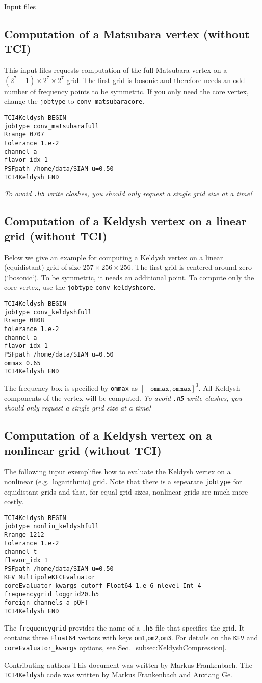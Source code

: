 \documentclass[12pt]{article}
\begin{document}
\begin{section}{Input files}
\subsection{Computation of a Matsubara vertex (without TCI)}
This input files requests computation of the full Matsubara vertex on a $(2^7+1)\times2^7\times2^7$ grid.
The first grid is bosonic and therefore needs an odd number of frequency points to be symmetric.
If you only need the core vertex, change the \texttt{jobtype} to \texttt{conv\_matsubaracore}.
\begin{verbatim}
TCI4Keldysh BEGIN
jobtype conv_matsubarafull
Rrange 0707
tolerance 1.e-2
channel a
flavor_idx 1
PSFpath /home/data/SIAM_u=0.50
TCI4Keldysh END  
\end{verbatim}
\textit{To avoid \texttt{.h5} write clashes, you should only request a single grid size at a time!}
\subsection{Computation of a Keldysh vertex on a linear grid (without TCI)}
Below we give an example for computing a Keldysh vertex on a linear (equidistant) grid of size
$257\times256\times256$. The first grid is centered around zero (`bosonic`). To be symmetric, it needs an additional point.
To compute only the core vertex, use the \texttt{jobtype} \texttt{conv\_keldyshcore}.
\begin{verbatim}
TCI4Keldysh BEGIN
jobtype conv_keldyshfull
Rrange 0808
tolerance 1.e-2
channel a
flavor_idx 1
PSFpath /home/data/SIAM_u=0.50
ommax 0.65
TCI4Keldysh END 
\end{verbatim}
The frequency box is specified by \texttt{ommax} as $[-\texttt{ommax},\texttt{ommax}]^3$.
All Keldysh components of the vertex will be computed.
\textit{To avoid \texttt{.h5} write clashes, you should only request a single grid size at a time!}

\subsection{Computation of a Keldysh vertex on a nonlinear grid (without TCI)}
The following input exemplifies how to evaluate the Keldysh vertex on a nonlinear (e.g.\ logarithmic) grid.
Note that there is a sepearate \texttt{jobtype} for equidistant grids and that, for equal grid sizes,
nonlinear grids are much more costly.
\begin{verbatim}
TCI4Keldysh BEGIN
jobtype nonlin_keldyshfull
Rrange 1212
tolerance 1.e-2
channel t
flavor_idx 1
PSFpath /home/data/SIAM_u=0.50
KEV MultipoleKFCEvaluator
coreEvaluator_kwargs cutoff Float64 1.e-6 nlevel Int 4
frequencygrid loggrid20.h5
foreign_channels a pQFT
TCI4Keldysh END 
\end{verbatim}
The \texttt{frequencygrid} provides the name of a \texttt{.h5} file that specifies the
grid. It contains three \texttt{Float64} vectors with keys \texttt{om1},\texttt{om2},\texttt{om3}.
For details on the \texttt{KEV} and \texttt{coreEvaluator\_kwargs} options, see Sec.\ \ref{subsec:KeldyshCompression}.
\end{section}

\begin{section}{Contributing authors}
This document was written by Markus Frankenbach. The \texttt{TCI4Keldysh} code was
written by Markus Frankenbach and Anxiang Ge.
\end{section}

\nocite{*}


\end{document}

